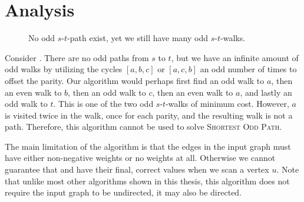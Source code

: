 \section{Analysis}

\begin{figure}
    \centering
    \caption{No odd $s$-$t$-path exist, yet we still have many odd $s$-$t$-walks.}
    \label{figure:small2}
 \end{figure}

Consider . There are no odd paths from $s$ to $t$, but we have an infinite amount of odd walks by utilizing the cycles $[a,b,c]$ or $[a,c,b]$ an odd number of times to offset the parity. Our algorithm would perhaps first find an odd walk to $a$, then an even walk to $b$, then an odd walk to $c$, then an even walk to $a$, and lastly an odd walk to $t$. This is one of the two odd $s$-$t$-walks of minimum cost. However, $a$ is visited twice in the walk, once for each parity, and the resulting walk is not a path. Therefore, this algorithm cannot be used to solve \textsc{Shortest Odd Path}.

The main limitation of the algorithm is that the edges in the input graph must have either non-negative weights or no weights at all. Otherwise we cannot guarantee that  and  have their final, correct values when we scan a vertex $u$. Note that unlike most other algorithms shown in this thesis, this algorithm does not require the input graph to be undirected, it may also be directed.


